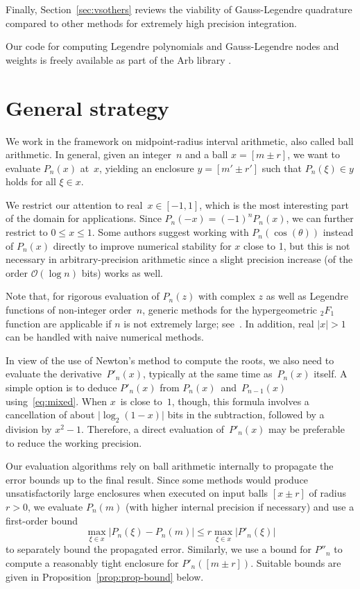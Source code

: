 \documentclass{siamart0216}
\newcommand{\abs}[1]{\mathopen| #1 \mathclose|}
\newcommand{\OO}{\mathcal{O}}
\begin{document}
Finally, Section~\ref{sec:vsothers} reviews the viability of Gauss-Legendre
quadrature compared to other methods
for extremely high precision integration.

Our code for computing Legendre polynomials and
Gauss-Legendre nodes and weights is freely available as part of
the Arb library \cite{Johansson2017arb}.

\section{General strategy}

\label{sec:general}

We work in the framework on midpoint-radius interval arithmetic,
also called ball arithmetic.
In general, given an integer~$n$ and a ball $x = [m \pm r]$,
we want to evaluate $P_n(x)$ at~$x$,
yielding an enclosure $y = [m' \pm r']$ such that $P_n(\xi) \in y$
holds for all $\xi \in x$.

We restrict our attention to real~$x \in [-1, 1]$,
which is the most interesting part of the domain for applications.
Since $P_n(-x) = (-1)^n P_n(x)$, we can further
restrict to $0 \le x \le 1$.
Some authors suggest working with $P_n(\cos(\theta))$ instead of $P_n(x)$
directly to improve numerical stability for $x$ close to 1, but
this is not necessary in arbitrary-precision arithmetic since
a slight precision increase (of the order $\OO(\log n)$ bits)
works as well.

Note that, for rigorous evaluation of $P_n(z)$ with complex $z$
as well as Legendre functions of non-integer order $n$,
generic methods for the hypergeometric ${}_2F_1$ function
are applicable if $n$ is not extremely large; see~\cite{johansson2016hypergeometric}.
In addition, real $|x| > 1$ can be handled with naive numerical methods.

In view of the use of Newton's method to compute the roots,
we also need to evaluate the derivative $P'_n(x)$,
typically at the same time as $P_n(x)$ itself.
A simple option is to deduce $P'_n(x)$ from
$P_n(x)$ and $P_{n-1}(x)$ using \eqref{eq:mixed}.
When $x$ is close to~$1$, though, this formula involves a
cancellation of about $\abs{\log_2(1 - x)}$ bits in the subtraction,
followed by a division by $x^2 - 1$. Therefore, a direct evaluation
of $P'_n(x)$ may be preferable to reduce the working precision.

Our evaluation algorithms rely on ball arithmetic internally to
propagate the error bounds up to the final result.
Since some methods would produce unsatisfactorily large enclosures
when executed on input balls $[x \pm r]$ of radius $r > 0$, we
evaluate $P_n(m)$ (with higher internal precision if necessary) and
use a first-order bound
\[ \max_{\xi \in x} |P_n(\xi) - P_n(m)|
   \le r \max_{\xi \in x} |P'_n(\xi)| \]
to separately bound the propagated error.
Similarly, we use a bound for $P''_n$ to compute a reasonably
tight enclosure for $P'_n([m \pm r])$.
Suitable bounds are given in Proposition~\ref{prop:prop-bound} below.
\end{document}
